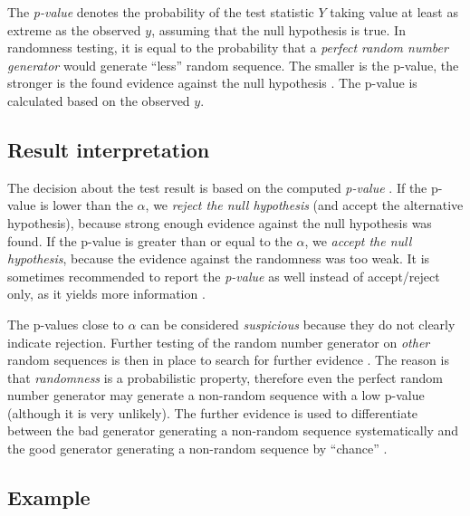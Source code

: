\documentclass[
  digital,     %
  oneside,     %
  nosansbold,  %
  nocolorbold, %
  nolof,         %
  nolot,         %
]{fithesis4}
\begin{document}

The \emph{p-value} denotes the probability of the test statistic $Y$ taking value at least as extreme as the observed $y$, assuming that the null hypothesis is true. In randomness testing, it is equal to the probability that a \emph{perfect random number generator} would generate ``less'' random sequence. The smaller is the p-value, the stronger is the found evidence against the null hypothesis \cite[p. 386]{basic_practice}. The p-value is calculated based on the observed $y$.



\subsection{Result interpretation} \label{chap:rand-interpretation}

The decision about the test result is based on the computed \emph{p-value} \cite[p. 390]{basic_practice}. If the p-value is lower than the $\alpha$, we \emph{reject the null hypothesis} (and accept the alternative hypothesis), because strong enough evidence against the null hypothesis was found. If the p-value is greater than or equal to the $\alpha$, we \emph{accept the null hypothesis}, because the evidence against the randomness was too weak. It is sometimes recommended to report the \emph{p-value} as well instead of accept/reject only, as it yields more information \cite[p. 90]{tu01_guide}.

The p-values close to $\alpha$ can be considered \emph{suspicious} because they do not clearly indicate rejection. Further testing of the random number generator on \emph{other} random sequences is then in place to search for further evidence \cite[p.~5]{tu01_paper}. The reason is that \emph{randomness} is a probabilistic property, therefore even the perfect random number generator may generate a non-random sequence with a low p-value (although it is very unlikely). The further evidence is used to differentiate between the bad generator generating a non-random sequence systematically and the good generator generating a non-random sequence by ``chance'' \cite[p. 90]{tu01_guide}.

\subsection{Example} \label{chap:rand-example}
\end{document}
